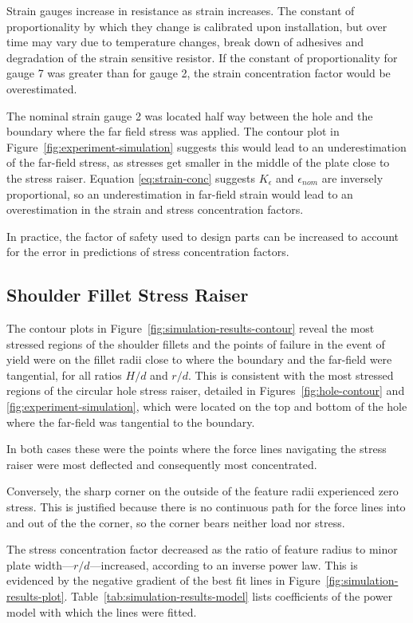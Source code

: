 \documentclass[a4paper,11pt,twocolumn]{article}
\begin{document}
Strain gauges increase in resistance as strain increases. The constant of
proportionality by which they change is calibrated upon installation, but over
time may vary due to temperature changes, break down of adhesives and
degradation of the strain sensitive resistor. If the constant of
proportionality for gauge 7 was greater than for gauge 2, the strain
concentration factor would be overestimated.

The nominal strain gauge 2 was located half way between the hole and the
boundary where the far field stress was applied. The contour plot in
Figure~\ref{fig:experiment-simulation} suggests this would lead to an
underestimation of the far-field stress, as stresses get smaller in the middle
of the plate close to the stress raiser. Equation \eqref{eq:strain-conc}
suggests $K_{\epsilon}$ and $\epsilon_{nom}$ are inversely proportional, so an
underestimation in far-field strain would lead to an overestimation in the
strain and stress concentration factors.

In practice, the factor of safety used to design parts can be increased to
account for the error in predictions of stress concentration factors.

\subsection{Shoulder Fillet Stress Raiser}

The contour plots in Figure~\vref{fig:simulation-results-contour} reveal the
most stressed regions of the shoulder fillets and the points of failure in
the event of yield were on the fillet radii close to where the boundary and the
far-field were tangential, for all ratios $H/d$ and $r/d$. This is consistent
with the most stressed regions of the circular hole stress raiser, detailed in 
Figures~\ref{fig:hole-contour} and \ref{fig:experiment-simulation}, which were
located on the top and bottom of the hole where the far-field was tangential to
the boundary.

In both cases these were the points where the force lines navigating the stress
raiser were most deflected and consequently most concentrated.

Conversely, the sharp corner on the outside of the feature radii experienced
zero stress. This is justified because there is no continuous path for the
force lines into and out of the the corner, so the corner bears neither load
nor stress.

The stress concentration factor decreased as the ratio of feature radius to
minor plate width---$r/d$---increased, according to an inverse power law.
This is evidenced by the negative gradient of the best fit lines in 
Figure~\ref{fig:simulation-results-plot}. 
Table~\ref{tab:simulation-results-model} lists coefficients of the power model
with which the lines were fitted.
\end{document}
